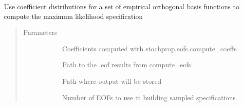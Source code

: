 \documentclass[letterpaper,10pt,english]{sphinxmanual}
\begin{document}
\begin{fulllineitems}
\label{\detokenize{stochprop.eofs:stochprop.eofs.maximum_likelihood_profile}}
Use coefficient distributions for a set of empirical orthogonal
basis functions to compute the maximum likelihood specification
\begin{quote}\begin{description}
\item[{Parameters}] \leavevmode\begin{description}
\item[{}] \leavevmode
Coefficients computed with stochprop.eofs.compute\_coeffs

\item[{}] \leavevmode
Path to the .eof results from compute\_eofs

\item[{}] \leavevmode
Path where output will be stored

\item[{}] \leavevmode
Number of EOFs to use in building sampled specifications

\end{description}

\end{description}\end{quote}

\end{fulllineitems}

\end{document}
